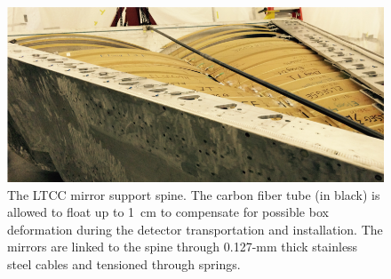 \begin{figure} [htbp]
	\centering
	\includegraphics[width=1.0\columnwidth,keepaspectratio]{img/spine.png}
	\caption{The LTCC mirror support spine. The carbon fiber tube (in black) is allowed to float up to 1~cm to
          compensate for possible box deformation during the detector transportation and installation. The mirrors
          are linked to the spine through 0.127-mm thick stainless steel cables and tensioned through springs.}
	\label{fig:spine}
\end{figure}
